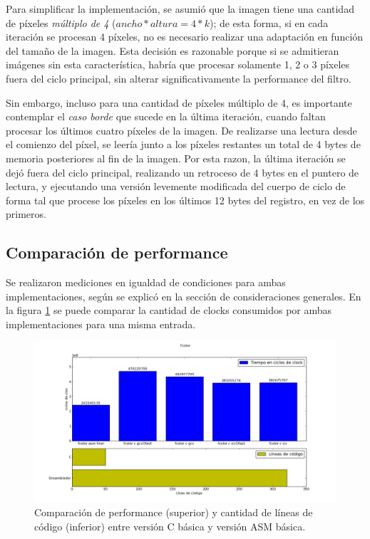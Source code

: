 Para simplificar la implementación, se asumió que la imagen tiene una cantidad de píxeles \emph{múltiplo de 4} ($ancho * altura = 4 * k$); de esta forma, si en cada iteración se procesan 4 píxeles, no es necesario realizar una adaptación en función del tamaño de la imagen. Esta decisión es razonable porque si se admitieran imágenes sin esta característica, habría que procesar solamente 1, 2 o 3 píxeles fuera del ciclo principal, sin alterar significativamente la performance del filtro.

Sin embargo, incluso para una cantidad de píxeles múltiplo de 4, es importante contemplar el \emph{caso borde} que sucede en la última iteración, cuando faltan procesar los últimos cuatro píxeles de la imagen. De realizarse una lectura desde el comienzo del píxel, se leería junto a los píxeles restantes un total de 4 bytes de memoria posteriores al fin de la imagen. Por esta razon, la última iteración se dejó fuera del ciclo principal, realizando un retroceso de 4 bytes en el puntero de lectura, y ejecutando una versión levemente modificada del cuerpo de ciclo de forma tal que procese los píxeles en los últimos 12 bytes del registro, en vez de los primeros.

\subsection{Comparación de performance}
\label{sub:comparaci_n_de_performance_fcolor}

Se realizaron mediciones en igualdad de condiciones para ambas implementaciones, según se explicó en la sección de consideraciones generales. En la figura \ref{fig:filtro-color-C-vs-ASM} se puede comparar la cantidad de clocks consumidos por ambas implementaciones para una misma entrada.

\begin{figure}[H]
\begin{center}
  \includegraphics[scale=0.5]{secciones/filtro_color/graficos/fcolor.png}
\end{center}
\caption{Comparación de performance (superior) y cantidad de líneas de código (inferior) entre versión C básica y versión ASM básica.}
\label{fig:filtro-color-C-vs-ASM}
\end{figure}

